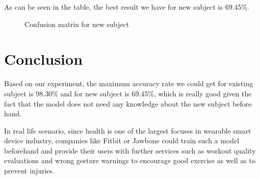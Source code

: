 \documentclass{article} %
\begin{document}
As can be seen in the table, the best result we have for new subject is 69.45\%.

\begin{figure}[hbt]
\begin{center}
\end{center}
\caption{Confusion matrix for new subject}
\end{figure}

%

\section{Conclusion}

Based on our experiment, the maximum accuracy rate we could get for existing subject is 98.30\% and for new subject is 69.45\%, which is really good given the fact that the model does not need any knowledge about the new subject before hand.

In real life scenario, since health is one of the largest focuses in wearable smart device industry, companies like Fitbit or Jawbone could train such a model beforehand and provide their users with further services such as workout quality evaluations and wrong gesture warnings to encourage good exercise as well as to prevent injuries.
\end{document}
